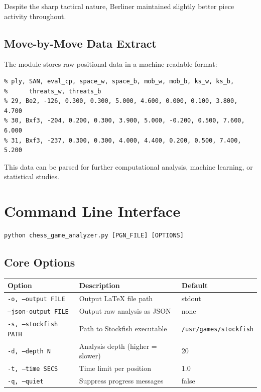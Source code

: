 \documentclass[12pt]{book}
\begin{document}
Despite the sharp tactical nature, Berliner maintained slightly better piece activity throughout.


\subsection{Move-by-Move Data Extract}

The module stores raw positional data in a machine-readable format:

\begin{verbatim}
% ply, SAN, eval_cp, space_w, space_b, mob_w, mob_b, ks_w, ks_b, 
%      threats_w, threats_b
% 29, Be2, -126, 0.300, 0.300, 5.000, 4.600, 0.000, 0.100, 3.800, 4.700
% 30, Bxf3, -204, 0.200, 0.300, 3.900, 5.000, -0.200, 0.500, 7.600, 6.000
% 31, Bxf3, -237, 0.300, 0.300, 4.000, 4.400, 0.200, 0.500, 7.400, 5.200
\end{verbatim}

This data can be parsed for further computational analysis, machine learning, or statistical studies.

\section{Command Line Interface}

\begin{verbatim}
python chess_game_analyzer.py [PGN_FILE] [OPTIONS]
\end{verbatim}

\subsection{Core Options}

\begin{center}
\begin{tabular}{lll}
\toprule
\textbf{Option} & \textbf{Description} & \textbf{Default} \\
\midrule
\texttt{-o, --output FILE} & Output \LaTeX{} file path & stdout \\
\texttt{--json-output FILE} & Output raw analysis as JSON & none \\
\texttt{-s, --stockfish PATH} & Path to Stockfish executable & \texttt{/usr/games/stockfish} \\
\texttt{-d, --depth N} & Analysis depth (higher = slower) & 20 \\
\texttt{-t, --time SECS} & Time limit per position & 1.0 \\
\texttt{-q, --quiet} & Suppress progress messages & false \\
\bottomrule
\end{tabular}
\end{center}
\end{document}
